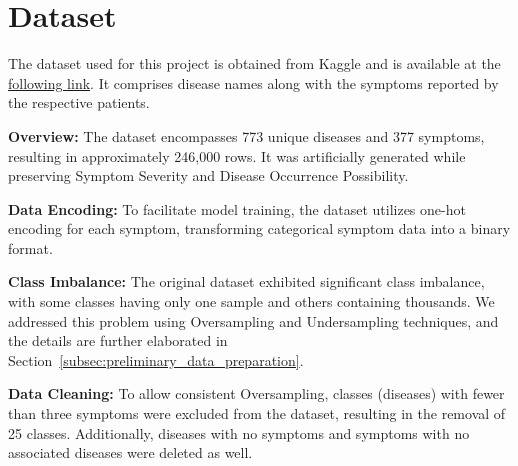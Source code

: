 \section{Dataset}

The dataset used for this project is obtained from Kaggle and is available at the
\href{https://www.kaggle.com/datasets/dhivyeshrk/diseases-and-symptoms-dataset?select=Final_Augmented_dataset_Diseases_and_Symptoms.csv}{following link}.
It comprises disease names along with the symptoms reported by the respective patients.

\noindent
\textbf{Overview:} The dataset encompasses 773 unique diseases and 377 symptoms, resulting in approximately 246,000 rows.
It was artificially generated while preserving Symptom Severity and Disease Occurrence Possibility.

\noindent
\textbf{Data Encoding:} To facilitate model training, the dataset utilizes one-hot encoding for each symptom, transforming
categorical symptom data into a binary format.

\noindent
\textbf{Class Imbalance:} The original dataset exhibited significant class imbalance, with some classes having only one
sample and others containing thousands. We addressed this problem using Oversampling and Undersampling techniques,
and the details are further elaborated in Section~\ref{subsec:preliminary_data_preparation}.

\noindent
\textbf{Data Cleaning:} To allow consistent Oversampling, classes (diseases) with fewer than three symptoms were excluded
from the dataset, resulting in the removal of 25 classes. Additionally, diseases with no symptoms and symptoms with
no associated diseases were deleted as well.

